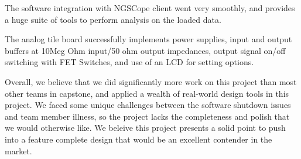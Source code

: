 The software integration with NGSCope client went very smoothly, and provides a huge suite of tools to perform analysis on the loaded data.

The analog tile board successfully implements power supplies, input and output buffers at 10Meg Ohm input/50 ohm output impedances, output signal on/off switching with FET Switches, and use of an LCD for setting options.

Overall, we believe that we did significantly more work on this project than most other teams in capstone, and applied a wealth of real-world design tools in this project. We faced some unique challenges between the software shutdown issues and team member illness, so the project lacks the completeness and polish that we would otherwise like. We beleive this project presents a solid point to push into a feature complete design that would be an excellent contender in the market.